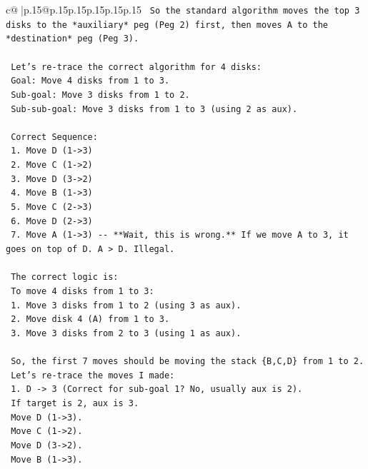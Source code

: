 \documentclass{article}
\begin{document}
{\begin{supertabular}{c@{$\;$}|p{.15\linewidth}@{}p{.15\linewidth}p{.15\linewidth}p{.15\linewidth}p{.15\linewidth}p{.15\linewidth}}
{{{\texttt{    So the standard algorithm moves the top 3 disks to the *auxiliary* peg (Peg 2) first, then moves A to the *destination* peg (Peg 3).} \\
\\ 
\texttt{    Let's re{-}trace the correct algorithm for 4 disks:} \\
\texttt{    Goal: Move 4 disks from 1 to 3.} \\
\texttt{    Sub{-}goal: Move 3 disks from 1 to 2.} \\
\texttt{    Sub{-}sub{-}goal: Move 3 disks from 1 to 3 (using 2 as aux).} \\
\\ 
\texttt{    Correct Sequence:} \\
\texttt{    1. Move D (1{-}>3)} \\
\texttt{    2. Move C (1{-}>2)} \\
\texttt{    3. Move D (3{-}>2)} \\
\texttt{    4. Move B (1{-}>3)} \\
\texttt{    5. Move C (2{-}>3)} \\
\texttt{    6. Move D (2{-}>3)} \\
\texttt{    7. Move A (1{-}>3) {-}{-} **Wait, this is wrong.** If we move A to 3, it goes on top of D. A > D. Illegal.} \\
\\ 
\texttt{    The correct logic is:} \\
\texttt{    To move 4 disks from 1 to 3:} \\
\texttt{    1. Move 3 disks from 1 to 2 (using 3 as aux).} \\
\texttt{    2. Move disk 4 (A) from 1 to 3.} \\
\texttt{    3. Move 3 disks from 2 to 3 (using 1 as aux).} \\
\\ 
\texttt{    So, the first 7 moves should be moving the stack \{B,C,D\} from 1 to 2.} \\
\texttt{    Let's re{-}trace the moves I made:} \\
\texttt{    1. D {-}> 3 (Correct for sub{-}goal 1? No, usually aux is 2).} \\
\texttt{       If target is 2, aux is 3.} \\
\texttt{       Move D (1{-}>3).} \\
\texttt{       Move C (1{-}>2).} \\
\texttt{       Move D (3{-}>2).} \\
\texttt{       Move B (1{-}>3).} \\
}}}
\end{supertabular}}
\end{document}
